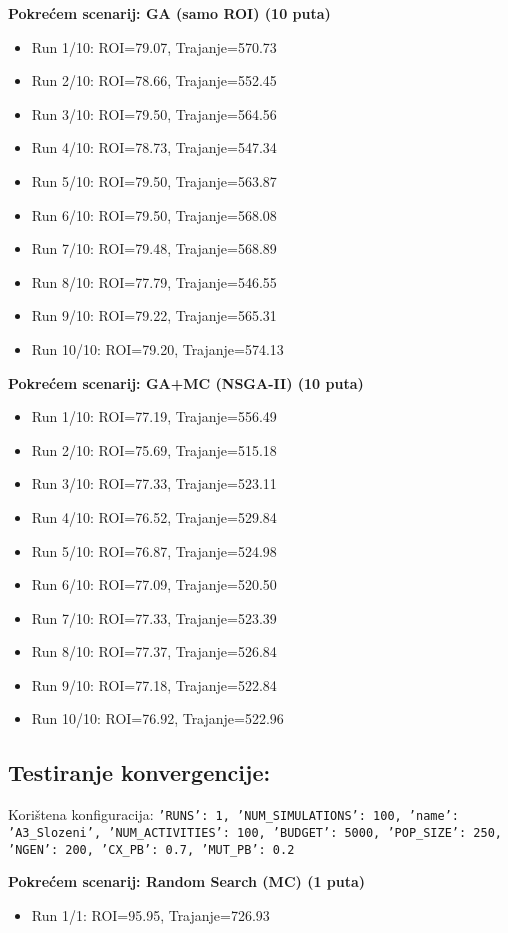 \textbf{Pokrećem scenarij: GA (samo ROI) (10 puta)}
\begin{itemize}
    \item Run 1/10: ROI=79.07, Trajanje=570.73
    \item Run 2/10: ROI=78.66, Trajanje=552.45
    \item Run 3/10: ROI=79.50, Trajanje=564.56
    \item Run 4/10: ROI=78.73, Trajanje=547.34
    \item Run 5/10: ROI=79.50, Trajanje=563.87
    \item Run 6/10: ROI=79.50, Trajanje=568.08
    \item Run 7/10: ROI=79.48, Trajanje=568.89
    \item Run 8/10: ROI=77.79, Trajanje=546.55
    \item Run 9/10: ROI=79.22, Trajanje=565.31
    \item Run 10/10: ROI=79.20, Trajanje=574.13
\end{itemize}

\textbf{Pokrećem scenarij: GA+MC (NSGA-II) (10 puta)}
\begin{itemize}
    \item Run 1/10: ROI=77.19, Trajanje=556.49
    \item Run 2/10: ROI=75.69, Trajanje=515.18
    \item Run 3/10: ROI=77.33, Trajanje=523.11
    \item Run 4/10: ROI=76.52, Trajanje=529.84
    \item Run 5/10: ROI=76.87, Trajanje=524.98
    \item Run 6/10: ROI=77.09, Trajanje=520.50
    \item Run 7/10: ROI=77.33, Trajanje=523.39
    \item Run 8/10: ROI=77.37, Trajanje=526.84
    \item Run 9/10: ROI=77.18, Trajanje=522.84
    \item Run 10/10: ROI=76.92, Trajanje=522.96
\end{itemize}


\subsection*{Testiranje konvergencije:}
Korištena konfiguracija: \texttt{'RUNS': 1, 'NUM\_SIMULATIONS': 100, 'name': 'A3\_Slozeni', 'NUM\_ACTIVITIES': 100, 'BUDGET': 5000, 'POP\_SIZE': 250, 'NGEN': 200, 'CX\_PB': 0.7, 'MUT\_PB': 0.2}

\textbf{Pokrećem scenarij: Random Search (MC) (1 puta)}
\begin{itemize}
    \item Run 1/1: ROI=95.95, Trajanje=726.93
\end{itemize}

